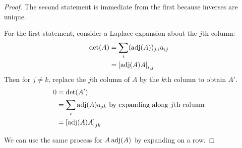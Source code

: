 \documentclass[../Main.tex]{subfiles}
\begin{document}
\begin{proof}
    The second statement is immediate from the first because inverses are unique.

    For the first statement, consider a Laplace expansion about the $j$th column:
    \begin{align*}
        \det(A) &= \sum_i (\operatorname{adj}(A))_{j, i} a_{ij} \\
        &= \left[\operatorname{adj}(A) A\right]_{i, j}
    \end{align*}
    Then for $j \neq k$, replace the $j$th column of $A$ by the $k$th column to obtain $A'$.
    \begin{align*}
        0 &= \det(A')\\
        &= \sum_{i} \operatorname{adj}(A) a_{jk} \text{ by expanding along } j\text{th column} \\
        &= \left[\operatorname{adj}(A) A\right]_{jk}
    \end{align*}

    We can use the same process for $A \operatorname{adj}(A)$ by expanding on a row.
\end{proof}
\end{document}
